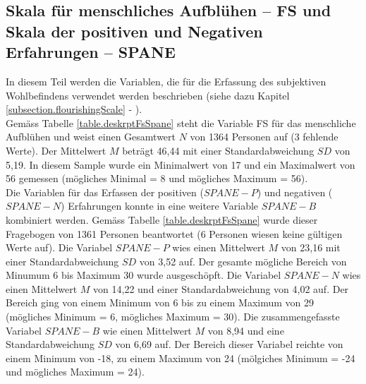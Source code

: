 \subsection{Skala für menschliches Aufblühen -- FS und Skala der positiven und Negativen Erfahrungen -- SPANE}
In diesem Teil werden die Variablen, die für die Erfassung des subjektiven Wohlbefindens verwendet werden beschrieben (siehe dazu Kapitel \ref{subsection.flourishingScale} - ).\\
Gemäss Tabelle \ref{table.deskrptFsSpane} steht die Variable FS für das menschliche Aufblühen und weist einen Gesamtwert $N$ von 1364 Personen auf (3 fehlende Werte). Der Mittelwert $M$ beträgt 46,44 mit einer Standardabweichung $SD$ von 5,19. In diesem Sample wurde ein Minimalwert von 17 und ein Maximalwert von 56 gemessen (mögliches Minimal = 8 und mögliches Maximum = 56).\\
Die Variablen für das Erfassen der positiven ($SPANE-P$) und negativen ($SPANE-N$) Erfahrungen konnte in eine weitere Variable $SPANE-B$ kombiniert werden. Gemäss Tabelle \ref{table.deskrptFsSpane} wurde dieser Fragebogen von 1361 Personen beantwortet (6 Personen wiesen keine gültigen Werte auf). Die Variabel $SPANE-P$ wies einen Mittelwert $M$ von 23,16 mit einer Standardabweichung $SD$ von 3,52 auf. Der gesamte mögliche Bereich von Minumum 6 bis Maximum 30 wurde ausgeschöpft. Die Variabel $SPANE-N$ wies einen Mittelwert $M$ von 14,22 und einer Standardabweichung von 4,02 auf. Der Bereich ging von einem Minimum von 6 bis zu einem Maximum von 29 (mögliches Minimum = 6, mögliches Maximum = 30). Die zusammengefasste Variabel $SPANE-B$ wie einen Mittelwert $M$ von 8,94 und eine Standardabweichung $SD$ von 6,69 auf. Der Bereich dieser Variabel reichte von einem Minimum von -18, zu einem Maximum von 24 (mölgiches Minimum = -24 und mögliches Maximum = 24).
